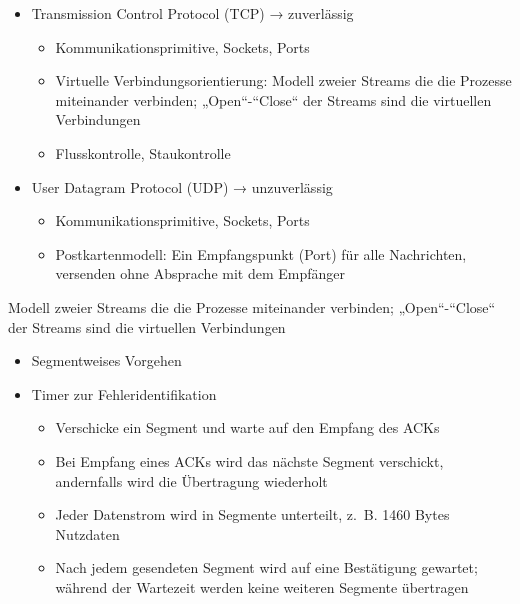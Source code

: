 
\begin{itemize}
    \item Transmission Control Protocol (TCP) → zuverlässig
    \begin{itemize}
        \item Kommunikationsprimitive, Sockets, Ports
        \item Virtuelle Verbindungsorientierung: Modell zweier Streams die die Prozesse miteinander verbinden;
        „Open“-“Close“ der Streams sind die virtuellen Verbindungen
        \item Flusskontrolle, Staukontrolle
    \end{itemize}
    \item User Datagram Protocol (UDP) → unzuverlässig
    \begin{itemize}
        \item Kommunikationsprimitive, Sockets, Ports
        \item Postkartenmodell: Ein Empfangspunkt (Port) für alle Nachrichten, versenden ohne Absprache mit dem Empfänger
    \end{itemize}
\end{itemize}

Modell zweier Streams die die Prozesse miteinander verbinden;
„Open“-“Close“ der Streams sind die virtuellen Verbindungen

\begin{itemize}
    \item Segmentweises Vorgehen
    \item Timer zur Fehleridentifikation
    \begin{itemize}
        \item Verschicke ein Segment und warte auf den Empfang des ACKs
        \item Bei Empfang eines ACKs wird das nächste Segment verschickt, andernfalls wird die Übertragung wiederholt
        \item Jeder Datenstrom wird in Segmente unterteilt, z.\ B. 1460 Bytes Nutzdaten
        \item Nach jedem gesendeten Segment wird auf eine Bestätigung gewartet;
        während der Wartezeit werden keine weiteren Segmente übertragen
    \end{itemize}
\end{itemize}

